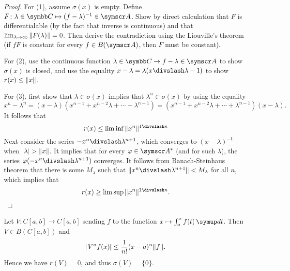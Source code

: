 \begin{proof}
  For (1), assume $\sigma(x)$ is empty. Define $F\colon \lambda\in\CC\mapsto (f-\lambda)^{-1}\in \BA A$. Show by direct calculation that $F$ is differentialable (by the fact that inverse is continuous) and that $\lim_{\lambda\to\infty} \Vert F(\lambda)\Vert=0$. Then derive the contradiction using the Liouville's theorem (if $fF$ is constant for every $f\in B(\BA A)$, then $F$ must be constant).

  For (2), use the continuous function $\lambda\in\CC\to f-\lambda\in\BA A$ to show $\sigma(x)$ is closed, and use the equality $x-\lambda=\lambda(x\DIV\lambda-1)$ to show $r(x)\leq \Vert x\Vert$.

  For (3), first show that $\lambda\in\sigma(x)$ implies that $\lambda^n\in\sigma(x)$ by using the equality
  \begin{equation*}
    x^n-\lambda^n = (x-\lambda)(x^{n-1}+x^{n-2}\lambda+\dotsb+\lambda^{n-1}) = (x^{n-1}+x^{n-2}\lambda+\dotsb+\lambda^{n-1})(x-\lambda).
  \end{equation*}
  It follows that
  \begin{equation*}
    r(x)\leq \liminf \NORM{x^n}^{1\DIV n}
  \end{equation*}
  Next consider the series $-x^n\DIV \lambda^{n+1}$, which converges to $(x-\lambda)^{-1}$ when $\vert\lambda\vert>\Vert x\Vert$. It implies that for every $\varphi\in\BA A^*$ (and for such $\lambda$), the series $\varphi(-x^n\DIV \lambda^{n+1})$ converges. It follows from Banach-Steinhaus theorem that there is some $M_\lambda$ such that $\NORM{x^n\DIV \lambda^{n+1}}<M_\lambda$ for all $n$, which implies that
  \begin{equation*}
    r(x)\geq \limsup\NORM{x^n}^{1\DIV n}.
  \end{equation*}
\end{proof}

\begin{example}
  Let $V\colon C[a, b]\to C[a, b]$ sending $f$ to the function $x\mapsto \int_a^x f(t)\DIFF t$. Then $V\in B(C[a, b])$ and
  \begin{equation*}
    \vert V^nf(x)\vert\leq\frac1{n!}(x-a)^n\Vert f\Vert.
  \end{equation*}
  Hence we have $r(V)=0$, and thus $\sigma(V)=\{0\}$.
\end{example}

